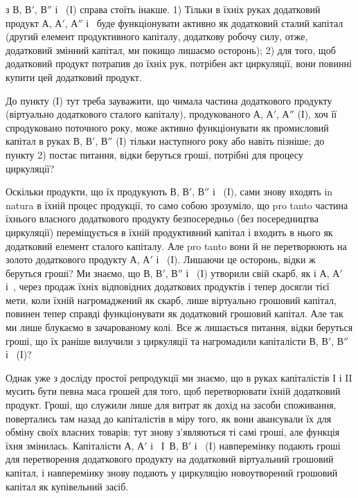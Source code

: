 \parcont{}  %
з $В$, $В'$, $В''$ і~ (І) справа стоїть інакше. 1) Тільки в їхніх руках
додатковий продукт $А$, $А'$, $А''$ і~ буде функціонувати активно як
додатковий сталий капітал (другий елемент продуктивного капіталу, додаткову
робочу силу, отже, додатковий змінний капітал, ми покищо
лишаємо осторонь); 2) для того, щоб додатковий продукт потрапив до
їхніх рук, потрібен акт циркуляції, вони повинні купити цей додатковий
продукт.

До пункту (І) тут треба зауважити, що чимала частина додаткового
продукту (віртуально додаткового сталого капіталу), продукованого
$А$, $А'$, $А''$ (І), хоч її спродуковано поточного року, може активно функціонувати
як промисловий капітал в руках $В$, $В'$, $В''$ (І) тільки наступного
року або навіть пізніше; до пункту 2) постає питання, відки беруться
гроші, потрібні для процесу циркуляції?

Оскільки продукти, що їх продукують $В$, $В'$, $В''$ і~ (І), сами
знову входять in natura в їхній процес продукції, то само собою зрозуміло,
що pro tanto частина їхнього власного додаткового продукту безпосередньо
(без посередництва циркуляції) переміщується в їхній продуктивний
капітал і входить в нього як додатковий елемент сталого капіталу.
Але pro tanto вони й не перетворюють на золото додаткового
продукту $А$, $А'$ і~ (І). Лишаючи це осторонь, відки ж беруться
гроші? Ми знаємо, що $В$, $В'$, $В''$ і~ (І) утворили свій скарб, як і
$А$, $А'$ і~, через продаж їхніх відповідних додаткових продуктів і
тепер досягли тієї мети, коли їхній нагромаджений як скарб, лише віртуально
грошовий капітал, повинен тепер справді функціонувати як
додатковий грошовий капітал. Але так ми лише блукаємо в зачарованому
колі. Все ж лишається питання, відки беруться гроші, що їх раніше
вилучили з циркуляції та нагромадили капіталісти $В$, $В'$, $В''$ і~ (І)?

Однак уже з досліду простої репродукції ми знаємо, що в руках
капіталістів І і II мусить бути певна маса грошей для того, щоб перетворювати
їхній додатковий продукт. Гроші, що служили лише для витрат
як дохід на засоби споживання, повертались там назад до капіталістів
в міру того, як вони авансували їх для обміну своїх власних товарів;
тут знову з’являються ті самі гроші, але функція їхня змінилась.
Капіталісти $А$, $А'$ і~ І~$В$, $В'$ і~ (І) навперемінку подають гроші
для перетворення додаткового продукту на додатковий віртуальний грошовий
капітал, і навперемінку знову подають у циркуляцію новоутворений
грошовий капітал як купівельний засіб.


